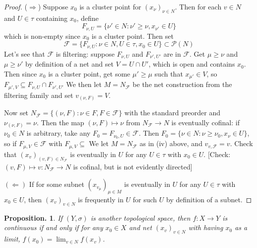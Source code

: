 \documentclass[11pt, a4paper]{memoir}
\newcommand{\impr}{{($\Longrightarrow$)\hspace{0.2cm}}}
\theoremstyle{change}
\newtheorem{proposition}[theorem]{Proposition.}
\theoremstyle{plain}
\theoremstyle{nonumberplain}
\newtheorem{proof}{Proof}
\numberwithin{equation}{section}
\begin{document}
\begin{proof}
    \impr
    Suppose $x_0$ is a cluster point for $(x_\nu)_{\nu\in N}$.
    Then for each $v\in N$ and $U\in\tau$ containing $x_0$, define
    \begin{equation*}
        F_{\nu,U}=\{\nu'\in N:\nu'\geq \nu,x_{\nu'}\in U\}
    \end{equation*}
    which is non-empty since $x_0$ is a cluster point.
    Then set
    \begin{equation*}
        \mathcal{F}=\{F_{\nu,U}:\nu\in N,U\in\tau,x_0\in U\}\subset\mathcal{P}(N)
    \end{equation*}
    Let's see that $\mathcal{F}$ is filtering: suppose $F_{\nu,U}$ and $F_{\nu',U'}$ are in $\mathcal{F}$.
    Get $\mu\geq\nu$ and $\mu\geq\nu'$ by definition of a net and set $V=U\cap U'$, which is open and contains $x_0$.
    Then since $x_0$ is a cluster point, get some $\mu'\geq \mu$ such that $x_{\mu'}\in V$, so $F_{\mu',V}\subseteq F_{\nu,U}\cap F_{\nu',U'}$
    We then let $M=N_{\mathcal{F}}$ be the net construction from the filtering family and set $v_{(\nu,F)}=V$.

    Now set $N_{\mathcal{F}}=\{(\nu,F):\nu\in F,F\in\mathcal{F}\}$ with the standard preorder and $\nu_{(\nu,F)}=\nu$.
    Then the map $(\nu,F)\mapsto\nu$ from $N_{\mathcal{F}}\to N$ is eventually cofinal: if $\nu_0\in N$ is arbitrary, take any $F_0=F_{\nu_0,U}\in\mathcal{F}$.
    Then $F_0=\{\nu\in N:\nu\geq\nu_0,x_\nu\in U\}$, so if $F_{\mu,V}\in\mathcal{F}$ with $F_{\mu,V}\subseteq$
    We let $M=N_{\mathcal{F}}$ as in (iv) above, and $v_{v,\mathcal{F}}=v$.
    Check that $(x_v)_{(v,F)\in N_{\mathcal{F}}}$ is eventually in $U$ for any $U\in\tau$ with $x_0\in U$.
    [Check: $(v,F)\mapsto v:N_{\mathcal{F}}\to N$ is cofinal, but is not evidently directed]
    
    $(\Leftarrow)$ If for some subnet $(x_{v_\mu})_{\mu\in M}$ is eventually in $U$ for any $U\in\tau$ with $x_0\in U$, then $(x_v)_{v\in N}$ is frequently in $U$ for such $U$ by definition of a subnet.
\end{proof}
\begin{proposition}
    If $(Y,\sigma)$ is another topological space, then $f:X\to Y$ is continuous if and only if for any $x_0\in X$ and net $(x_v)_{v\in N}$ with having $x_0$ as a limit, $f(x_0)=\lim_{v\in N}f(x_v)$.
\end{proposition}
\end{document}
